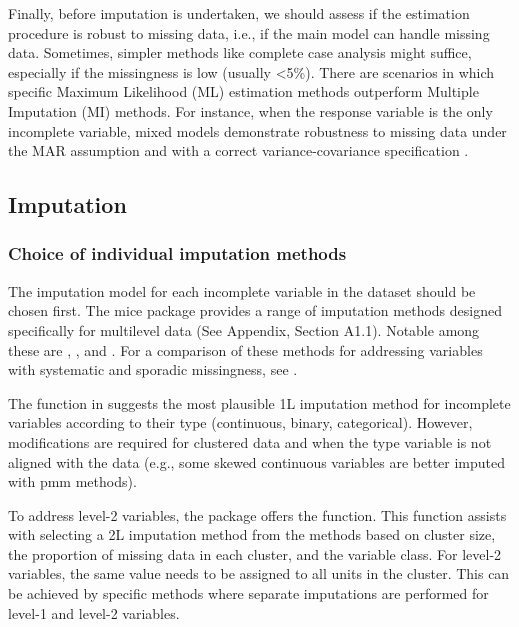 \documentclass[
  article]{jss}
\begin{document}
Finally, before imputation is undertaken, we should assess if the
estimation procedure is robust to missing data, i.e., if the main model
can handle missing data. Sometimes, simpler methods like complete case
analysis might suffice, especially if the missingness is low (usually
\textless5\%). There are scenarios in which specific Maximum Likelihood
(ML) estimation methods outperform Multiple Imputation (MI) methods. For
instance, when the response variable is the only incomplete variable,
mixed models demonstrate robustness to missing data under the MAR
assumption and with a correct variance-covariance specification
\citep{molenberghs2007}.

\subsection{Imputation}\label{imputation}

\subsubsection{Choice of individual imputation
methods}\label{choice-of-individual-imputation-methods}

The imputation model for each incomplete variable in the dataset should
be chosen first. The mice package provides a range of imputation methods
designed specifically for multilevel data (See Appendix, Section A1.1).
Notable among these are  \citep{jomo}, 
\citep{micemd}, and  \citep{schafer2002}. For a comparison of
these methods for addressing variables with systematic and sporadic
missingness, see \citep{audigier2018}.

The  function in  suggests the most
plausible 1L imputation method for incomplete variables according to
their type (continuous, binary, categorical). However, modifications are
required for clustered data and when the type variable is not aligned
with the data (e.g., some skewed continuous variables are better imputed
with pmm methods).

To address level-2 variables, the  package offers the
 function. This function assists with selecting
a 2L imputation method from the  methods based on cluster
size, the proportion of missing data in each cluster, and the variable
class. For level-2 variables, the same value needs to be assigned to all
units in the cluster. This can be achieved by specific methods where
separate imputations are performed for level-1 and level-2 variables.
\citep{grun18}
\end{document}
